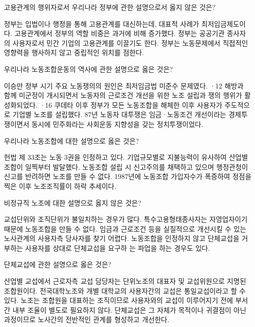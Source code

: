 \documentclass[11pt,answers]{exam} %
\begin{document}
\begin{questions}
\question[2] 고용관계의 행위자로서 우리나라 정부에 관한 설명으로서 옳지 않은 것은?
    \begin{choices}
    \choice\relax 정부는 입법이나 행정을 통해 고용관계를 대신하는데, 대표적 사례가 최저임금제도이다.
    \choice\relax 고용관계에서 정부의 역할 비중은 과거에 비해 증가했다.
    \choice\relax 정부는 공공기관 종사자의 사용자로서 민간 기업의 고용관계를 이끌기도 한다.
    \CorrectChoice\relax 정부는 노동문제에서 직접적인 영향력을 행사하지 않고 중립적인 위치를 점한다.
    \end{choices}

\question[2] 우리나라 노동조합운동의 역사에 관한 설명으로 옳은 것은?
    \begin{choices}
    \choice\relax 이승만 정부 시기 주요 노동쟁의의 원인은 최저임금법 미준수 문제였다.
    \choice{}·12 해방과 함께 미군정이 개시되면서 노동자의 근로조건 개선을 위한 노조 설립과 쟁의 행위가 활성화되었다.
    \choice{}·16 쿠데타 이후 정부가 모든 노동조합을 해체한 이후 사용자가 주도적으로 기업별 노조를 설립했다.
    \CorrectChoice\relax 87년 노동자 대투쟁은 임금·노동조건 개선이라는 경제투쟁이면서 동시에 민주화라는 사회운동 지향성을 갖는 정치투쟁이었다.
    \end{choices}

\question[2] 우리나라 노동조합에 대한 설명으로 옳은 것은?
    \begin{choices}
    \CorrectChoice\relax 헌법 제 33조는 노동 3권을 인정하고 있다.
    \choice\relax 기업규모별로 지불능력이 유사하여 산업별 조합이 일찍부터 발달했다.
    \choice\relax 노동조합 설립 시 신고주의를 채택하고 있으며 행정관청이 신고를 반려하면 노조를 만들 수 없다.
    \choice\relax 1987년에 노동조합 가입자수가 폭증하여 정점을 찍은 이후 노조조직률이 하락 추세이다.
    \end{choices}

\question[2] 비정규직 노조에 대한 설명으로 옳지 않은 것은?
    \begin{choices}
    \choice\relax 교섭단위와 조직단위가 불일치하는 경우가 많다.
    \CorrectChoice\relax 특수고용형태종사자는 자영업자이기 때문에 노동조합을 만들 수 없다.
    \choice\relax 임금과 근로조건 등을 실질적으로 개선시킬 수 있는 노사관계의 사용자측 당사자를 찾기 어렵다.
    \choice\relax 노동조합을 인정하지 않고 단체교섭을 거부하는 사용자를 상대로 단체교섭을 요구하 는 파업을 하는 경우도 있다.
    \end{choices}

\question[2] 단체교섭에 관한 설명으로 옳은 것은?
    \begin{choices}
    \choice\relax 산업별 교섭에서 근로자측 교섭 담당자는 단위노조의 대표자 및 교섭위원으로 지명된 조합원이다.
    \choice\relax 전국대학노조와 개별 대학교의 사용자간의 교섭은 통일교섭이라고 할 수 있다.
    \choice\relax 노조는 조합원을 대표하는 조직이므로 사용자와의 교섭이 이루어지기 전에 부서간 내부 조율이 별도로 필요하지 않다.
    \CorrectChoice\relax 단체교섭은 그 자체가 목적이나 귀결점이 아닌 과정이므로 노사간의 전반적인 관계를 형성하고 개선한다.
    \end{choices}


\end{questions}
\end{document}
